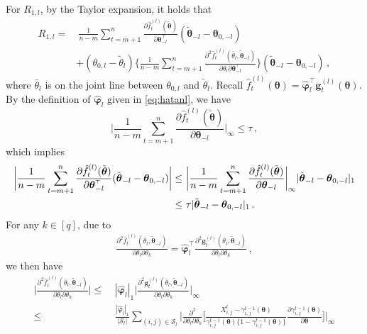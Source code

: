 \documentclass[12pt]{article}
\newcommand{\btheta}{\boldsymbol \theta}
\newcommand{\bvarphi}{\boldsymbol \varphi}
\def\T{{\scriptscriptstyle \top} }
\newcommand{\bg}{{\mathbf g}}
\newcommand{\0}{{\bf 0}}
\begin{document}
For $R_{1,l}$, by the Taylor expansion, it holds that
\begin{align*}
R_{1,l}=&~\frac{1}{n-m}\sum_{t=m+1}^n\frac{\partial\hat{f}_t^{(l)}(\tilde{\btheta})}{\partial\btheta_{-l}^{\T}}(\tilde{\btheta}_{-l}-\btheta_{0,-l})\\
&+(\theta_{0,l}-\tilde{\theta}_l)\bigg\{\frac{1}{n-m}\sum_{t=m+1}^n\frac{\partial^2\hat{f}_t^{(l)}(\bar{\theta}_l,\tilde{\btheta}_{-l})}{\partial\theta_l\partial\btheta_{-l}^{\T}}\bigg\}(\tilde{\btheta}_{-l}-\btheta_{0,-l})\,,
\end{align*}
where $\bar{\theta}_l$ is on the joint line between $\theta_{0,l}$ and $\tilde{\theta}_l$. Recall $\hat{f}_t^{(l)}(\btheta)=\hat{\bvarphi}_{l}^{\T}\bg_t^{(l)}(\btheta)$. By the definition of $\hat{\bvarphi}_{l}$ given in \eqref{eq:hatanl}, we have 
\[
\bigg|\frac{1}{n-m}\sum_{t=m+1}^n\frac{\partial\hat{f}_t^{(l)}(\tilde{\btheta})}{\partial\btheta_{-l}}\bigg|_\infty\leq \tau\,,
\]
which implies
\begin{align}
\bigg|\frac{1}{n-m}\sum_{t=m+1}^n\frac{\partial\hat{f}_t^{(l)}(\tilde{\btheta})}{\partial\btheta_{-l}^{\T}}(\tilde{\btheta}_{-l}-\btheta_{0,-l})\bigg|\leq&~ \bigg|\frac{1}{n-m}\sum_{t=m+1}^n\frac{\partial\hat{f}_t^{(l)}(\tilde{\btheta})}{\partial\btheta_{-l}}\bigg|_\infty |\tilde{\btheta}_{-l}-\btheta_{0,-l}|_1\notag\\
\leq&~\tau |\tilde{\btheta}_{-l}-\btheta_{0,-l}|_1\,.\label{eq:asybd1}
\end{align}
For any $k\in[q]$, due to
\begin{align*}
\frac{\partial^2\hat{f}_t^{(l)}(\bar{\theta}_l,\tilde{\btheta}_{-l})}{\partial\theta_l\partial\theta_k}=\hat{\bvarphi}_l^{\T}\frac{\partial^2\bg_t^{(l)}(\bar{\theta}_l,\tilde{\btheta}_{-l})}{\partial\theta_l\partial\theta_k}\,,
\end{align*}
we then have
\begin{align*}
\bigg|\frac{\partial^2\hat{f}_t^{(l)}(\bar{\theta}_l,\tilde{\btheta}_{-l})}{\partial\theta_l\partial\theta_k}\bigg|\leq&~ |\hat{\bvarphi}_l|_1\bigg|\frac{\partial^2\bg_t^{(l)}(\bar{\theta}_l,\tilde{\btheta}_{-l})}{\partial\theta_l\partial\theta_k}\bigg|_\infty\\
\leq&~\frac{|\hat{\bvarphi}_l|_1}{|\mathcal{S}_l|}\sum_{(i,j)\in\mathcal{S}_l}\bigg|\frac{\partial^2}{\partial\theta_l\partial\theta_k}\bigg[\frac{X_{i,j}^t-\gamma_{i,j}^{t-1}(\btheta)}{\gamma_{i,j}^{t-1}(\btheta)\{1-\gamma_{i,j}^{t-1}(\btheta)\}}\frac{\partial\gamma_{i,j}^{t-1}(\btheta)}{\partial\btheta}\bigg]\bigg|_\infty
\end{align*}
\end{document}
